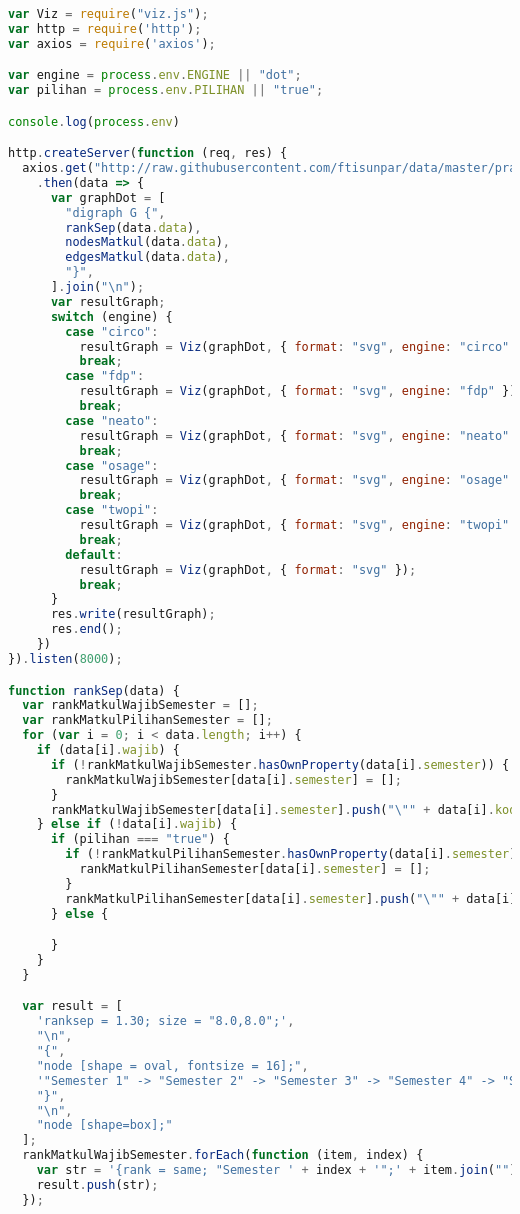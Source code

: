 \begin{lstlisting}[language=Javascript, caption=indexs.js]
var Viz = require("viz.js");
var http = require('http');
var axios = require('axios');

var engine = process.env.ENGINE || "dot";
var pilihan = process.env.PILIHAN || "true";

console.log(process.env)

http.createServer(function (req, res) {
  axios.get("http://raw.githubusercontent.com/ftisunpar/data/master/prasyarat.json") 
    .then(data => {
      var graphDot = [
        "digraph G {",
        rankSep(data.data),
        nodesMatkul(data.data),
        edgesMatkul(data.data),
        "}",
      ].join("\n");
      var resultGraph;
      switch (engine) {
        case "circo":
          resultGraph = Viz(graphDot, { format: "svg", engine: "circo" });
          break;
        case "fdp":
          resultGraph = Viz(graphDot, { format: "svg", engine: "fdp" });
          break;
        case "neato":
          resultGraph = Viz(graphDot, { format: "svg", engine: "neato" });
          break;
        case "osage":
          resultGraph = Viz(graphDot, { format: "svg", engine: "osage" });
          break;
        case "twopi":
          resultGraph = Viz(graphDot, { format: "svg", engine: "twopi" });
          break;
        default:
          resultGraph = Viz(graphDot, { format: "svg" });
          break;
      }
      res.write(resultGraph);
      res.end();
    })
}).listen(8000);

function rankSep(data) {
  var rankMatkulWajibSemester = [];
  var rankMatkulPilihanSemester = [];
  for (var i = 0; i < data.length; i++) {
    if (data[i].wajib) {
      if (!rankMatkulWajibSemester.hasOwnProperty(data[i].semester)) {
        rankMatkulWajibSemester[data[i].semester] = [];
      }
      rankMatkulWajibSemester[data[i].semester].push("\"" + data[i].kode + "\"\;");
    } else if (!data[i].wajib) {
      if (pilihan === "true") {
        if (!rankMatkulPilihanSemester.hasOwnProperty(data[i].semester)) {
          rankMatkulPilihanSemester[data[i].semester] = [];
        }
        rankMatkulPilihanSemester[data[i].semester].push("\"" + data[i].kode + "\"\;");
      } else {

      }
    }
  }

  var result = [
    'ranksep = 1.30; size = "8.0,8.0";',
    "\n",
    "{",
    "node [shape = oval, fontsize = 16];",
    '"Semester 1" -> "Semester 2" -> "Semester 3" -> "Semester 4" -> "Semester 5" -> "Semester 6" -> "Semester 7" -> "Semester 8";',
    "}",
    "\n",
    "node [shape=box];"
  ];
  rankMatkulWajibSemester.forEach(function (item, index) {
    var str = '{rank = same; "Semester ' + index + '";' + item.join("") + '}';
    result.push(str);
  });


\end{lstlisting}
